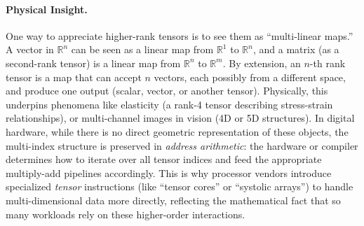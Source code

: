 \paragraph{Physical Insight.}
One way to appreciate higher-rank tensors is to see them as ``multi-linear maps.'' 
A vector in $\mathbb{R}^n$ can be seen as a linear map from $\mathbb{R}^1$ to $\mathbb{R}^n$, 
and a matrix (as a second-rank tensor) is a linear map from $\mathbb{R}^n$ to $\mathbb{R}^m$. 
By extension, an $n$-th rank tensor is a map that can accept $n$ vectors, each possibly from a 
different space, and produce one output (scalar, vector, or another tensor). Physically, 
this underpins phenomena like elasticity (a rank-4 tensor describing stress-strain relationships), 
or multi-channel images in vision (4D or 5D structures). In digital hardware, while there is 
no direct geometric representation of these objects, the multi-index structure is preserved 
in \emph{address arithmetic}: the hardware or compiler determines how to iterate over all 
tensor indices and feed the appropriate multiply-add pipelines accordingly. 
This is why processor vendors introduce specialized \emph{tensor} instructions (like ``tensor 
cores'' or ``systolic arrays'') to handle multi-dimensional data more directly, reflecting the 
mathematical fact that so many workloads rely on these higher-order interactions.


